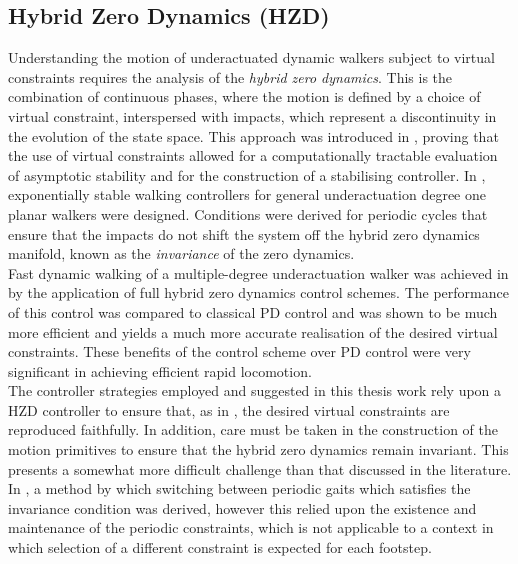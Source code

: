 \subsection{Hybrid Zero Dynamics (HZD)}
Understanding the motion of underactuated dynamic walkers subject to virtual constraints requires the analysis of the \textit{hybrid zero dynamics}. This is the combination of continuous phases, where the motion is defined by a choice of virtual constraint, interspersed with impacts, which represent a discontinuity in the evolution of the state space. This approach was introduced in \cite{grizzle2001asymptotically}, proving that the use of virtual constraints allowed for a computationally tractable evaluation of asymptotic stability and for the construction of a stabilising controller. In \cite{westervelt2003hybrid}, exponentially stable walking controllers for general underactuation degree one planar walkers were designed. Conditions were derived for periodic cycles that ensure that the impacts do not shift the system off the hybrid zero dynamics manifold, known as the \textit{invariance} of the zero dynamics. \\

Fast dynamic walking of a multiple-degree underactuation walker was achieved in \cite{sreenath2011compliant} by the application of full hybrid zero dynamics control schemes. The performance of this control was compared to classical PD control and was shown to be much more efficient and yields a much more accurate realisation of the desired virtual constraints. These benefits of the control scheme over PD control were very significant in achieving efficient rapid locomotion. \\

The controller strategies employed and suggested in this thesis work rely upon a HZD controller to ensure that, as in \cite{sreenath2011compliant}, the desired virtual constraints are reproduced faithfully. In addition, care must be taken in the construction of the motion primitives to ensure that the hybrid zero dynamics remain invariant. This presents a somewhat more difficult challenge than that discussed in the literature. In \cite{westervelt2007feedback}, a method by which switching between periodic gaits which satisfies the invariance condition was derived, however this relied upon the existence and maintenance of the periodic constraints, which is not applicable to a context in which selection of a different constraint is expected for each footstep.

